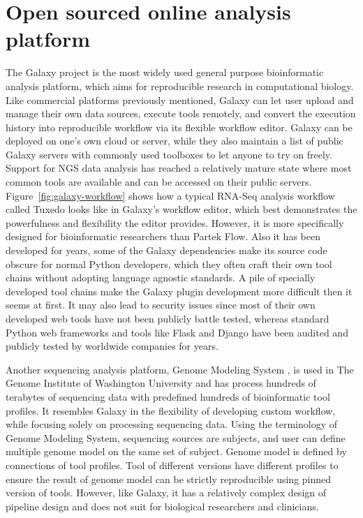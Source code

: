 


\section{Open sourced online analysis platform}

The Galaxy project \cite{goecks2010:galaxy} is the most widely used general
purpose bioinformatic analysis platform, which aims for reproducible research
in computational biology. Like commercial platforms previously mentioned,
Galaxy can let user upload and manage their own data sources, execute tools
remotely, and convert the execution history into reproducible workflow via its
flexible workflow editor. Galaxy can be deployed on one's own cloud or server,
while they also maintain a list of public Galaxy servers with commonly used
toolboxes to let anyone to try on freely. Support for NGS data analysis has
reached a relatively mature state where most common tools are available and can
be accessed on their public servers. Figure~\ref{fig:galaxy-workflow} shows how
a typical RNA-Seq analysis workflow called Tuxedo looks like in Galaxy's
workflow editor, which best demonstrates the powerfulness and flexibility the
editor provides. However, it is more specifically designed for bioinformatic
researchers than Partek Flow. Also it has been developed for years, some of the
Galaxy dependencies make its source code obscure for normal Python developers,
which they often craft their own tool chains without adopting language agnostic
standards. A pile of specially developed tool chains make the Galaxy plugin
development more difficult then it seems at first. It may also lead to security
issues since most of their own developed web tools have not been publicly
battle tested, whereas standard Python web frameworks and tools like Flask and
Django have been audited and publicly tested by worldwide companies for years.



Another sequencing analysis platform, Genome Modeling System
\cite{griffith2015:genome}, is used in The Genome Institute of Washington
University and has process hundreds of terabytes of sequencing data with
predefined hundreds of bioinformatic tool profiles. It resembles Galaxy in the
flexibility of developing custom workflow, while focusing solely on processing
sequencing data. Using the terminology of Genome Modeling System, sequencing
sources are subjects, and user can define multiple genome model on the same set
of subject. Genome model is defined by connections of tool profiles. Tool of
different versions have different profiles to ensure the result of genome model
can be strictly reproducible using pinned version of tools. However, like
Galaxy, it has a relatively complex design of pipeline design and does not suit
for biological researchers and clinicians.



